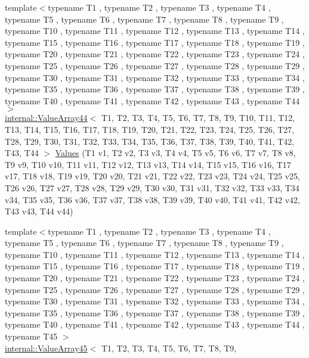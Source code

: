 \begin{DoxyCompactItemize}
{\footnotesize template$<$typename T1 , typename T2 , typename T3 , typename T4 , typename T5 , typename T6 , typename T7 , typename T8 , typename T9 , typename T10 , typename T11 , typename T12 , typename T13 , typename T14 , typename T15 , typename T16 , typename T17 , typename T18 , typename T19 , typename T20 , typename T21 , typename T22 , typename T23 , typename T24 , typename T25 , typename T26 , typename T27 , typename T28 , typename T29 , typename T30 , typename T31 , typename T32 , typename T33 , typename T34 , typename T35 , typename T36 , typename T37 , typename T38 , typename T39 , typename T40 , typename T41 , typename T42 , typename T43 , typename T44 $>$ }\\\hyperlink{classtesting_1_1internal_1_1ValueArray44}{internal\-::\-Value\-Array44}$<$ \-T1, \-T2, \*
\-T3, \-T4, \-T5, \-T6, \-T7, \-T8, \-T9, \*
\-T10, \-T11, \-T12, \-T13, \-T14, \-T15, \*
\-T16, \-T17, \-T18, \-T19, \-T20, \-T21, \*
\-T22, \-T23, \-T24, \-T25, \-T26, \-T27, \*
\-T28, \-T29, \-T30, \-T31, \-T32, \-T33, \*
\-T34, \-T35, \-T36, \-T37, \-T38, \-T39, \*
\-T40, \-T41, \-T42, \-T43, \-T44 $>$ \hyperlink{namespacetesting_a42848f3794e196c5a74f4b21db0752dd}{\-Values} (\-T1 v1, \-T2 v2, \-T3 v3, \-T4 v4, \-T5 v5, \-T6 v6, \-T7 v7, \-T8 v8, \-T9 v9, \-T10 v10, \-T11 v11, \-T12 v12, \-T13 v13, \-T14 v14, \-T15 v15, \-T16 v16, \-T17 v17, \-T18 v18, \-T19 v19, \-T20 v20, \-T21 v21, \-T22 v22, \-T23 v23, \-T24 v24, \-T25 v25, \-T26 v26, \-T27 v27, \-T28 v28, \-T29 v29, \-T30 v30, \-T31 v31, \-T32 v32, \-T33 v33, \-T34 v34, \-T35 v35, \-T36 v36, \-T37 v37, \-T38 v38, \-T39 v39, \-T40 v40, \-T41 v41, \-T42 v42, \-T43 v43, \-T44 v44)
\item 
{\footnotesize template$<$typename T1 , typename T2 , typename T3 , typename T4 , typename T5 , typename T6 , typename T7 , typename T8 , typename T9 , typename T10 , typename T11 , typename T12 , typename T13 , typename T14 , typename T15 , typename T16 , typename T17 , typename T18 , typename T19 , typename T20 , typename T21 , typename T22 , typename T23 , typename T24 , typename T25 , typename T26 , typename T27 , typename T28 , typename T29 , typename T30 , typename T31 , typename T32 , typename T33 , typename T34 , typename T35 , typename T36 , typename T37 , typename T38 , typename T39 , typename T40 , typename T41 , typename T42 , typename T43 , typename T44 , typename T45 $>$ }\\\hyperlink{classtesting_1_1internal_1_1ValueArray45}{internal\-::\-Value\-Array45}$<$ \-T1, \-T2, \*
\-T3, \-T4, \-T5, \-T6, \-T7, \-T8, \-T9, \*

\end{DoxyCompactItemize}
